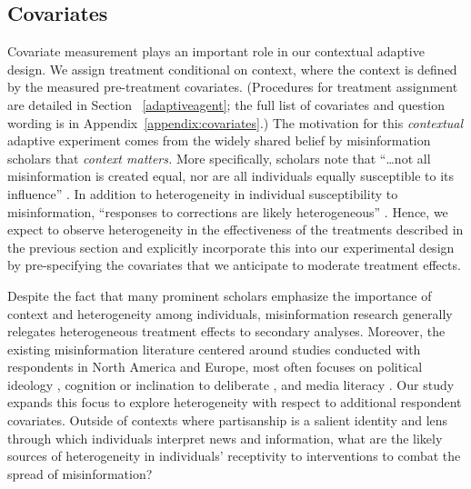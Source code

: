 \documentclass[letterpaper, 12pt, parskip=full,]{scrartcl}
\begin{document}


\subsection{Covariates}

Covariate measurement plays an important role in our contextual adaptive design. We assign treatment conditional on context, where the context is defined by the measured pre-treatment covariates. (Procedures for treatment assignment are detailed in Section ~\ref{adaptiveagent}; the full list of covariates and question wording is in Appendix~\ref{appendix:covariates}.)
The motivation for this \textit{contextual} adaptive experiment comes from the widely shared belief by misinformation scholars that \textit{context matters.} More specifically, scholars note that ``\dots not all misinformation is created equal, nor are all individuals equally susceptible to its influence'' \citep{wittenberg2020misinformation}. In addition to heterogeneity in individual susceptibility to misinformation, ``responses to corrections are likely heterogeneous'' \citep{swire2020searching}. Hence, we expect to observe heterogeneity in the effectiveness of the treatments described in the previous section and explicitly incorporate this into our experimental design by pre-specifying the covariates that we anticipate to moderate treatment effects.

Despite the fact that many prominent scholars emphasize the importance of context and heterogeneity among individuals, misinformation research generally relegates heterogeneous treatment effects to secondary analyses. Moreover, the existing misinformation literature centered around studies conducted with respondents in North America and Europe, most often focuses on political ideology \citep{pennycook_epstein_mosleh_arechar_eckles_rand_2019}, cognition or inclination to deliberate \citep{bago2020fake}, and media literacy \citep{guessetal2020digital}. Our study expands this focus to explore heterogeneity with respect to additional respondent covariates. Outside of contexts where partisanship is a salient identity and lens through which individuals interpret news and information, what are the likely sources of heterogeneity in individuals' receptivity to interventions to combat the spread of misinformation? 
\end{document}
